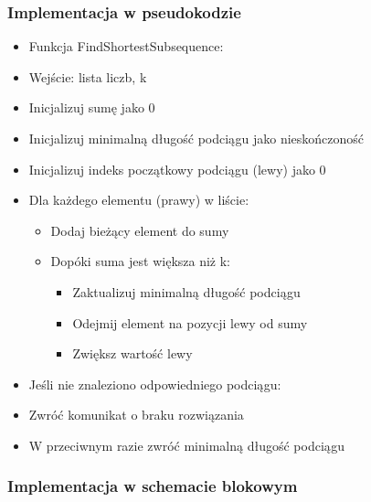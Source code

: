 \documentclass[12pt,twoside]{article}
\begin{document}
\subsubsection{Implementacja w pseudokodzie}
\begin{itemize}
  \item Funkcja FindShortestSubsequence:
  \item Wejście: lista liczb, k
  \item Inicjalizuj sumę jako 0
  \item Inicjalizuj minimalną długość podciągu jako nieskończoność
  \item Inicjalizuj indeks początkowy podciągu (lewy) jako 0
  \item Dla każdego elementu (prawy) w liście:
  \begin{itemize}
      \item Dodaj bieżący element do sumy
      \item Dopóki suma jest większa niż k:
      \begin{itemize}
          \item Zaktualizuj minimalną długość podciągu
          \item Odejmij element na pozycji lewy od sumy
          \item Zwiększ wartość lewy
      \end{itemize}
  \end{itemize}
  \item Jeśli nie znaleziono odpowiedniego podciągu:
  \item Zwróć komunikat o braku rozwiązania
  \item W przeciwnym razie zwróć minimalną długość podciągu
\end{itemize}
\subsubsection{Implementacja w schemacie blokowym}
\end{document}
